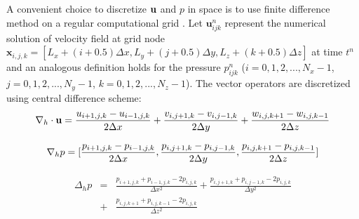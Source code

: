 A convenient choice to discretize $\mathbf{u}$ and $p$ in space is to use finite difference method on a regular computational grid \cite{blazek2015computational}. Let $\mathbf{u}^n_{ijk}$ represent the
numerical solution of velocity field at grid node  $\mathbf{x}_{i,j,k} =
[L_x+(i+0.5)\Delta x,L_y+(j+0.5)\Delta y, L_z+(k+0.5)\Delta z]$ at time $t^n$ 
and an analogous definition holds for the pressure $p^n_{ijk}$ ($i =
0,1,2,...,N_x-1$, $j = 0,1,2,...,N_y-1$, $k = 0,1,2,...,N_z-1$). The vector operators are discretized using central difference scheme:
\begin{equation} 
\nabla_h\cdot \mathbf{u} =
\frac{u_{i+1,j,k}-u_{i-1,j,k}}{2\Delta x} +
\frac{v_{i,j+1,k}-v_{i,j-1,k}}{2\Delta y} +
\frac{w_{i,j,k+1}-w_{i,j,k-1}}{2\Delta z}
\end{equation}

\begin{equation}
\nabla_h p =
[\frac{p_{i+1,j,k}-p_{i-1,j,k}}{2\Delta x},
\frac{p_{i,j+1,k}-p_{i,j-1,k}}{2\Delta y},
\frac{p_{i,j,k+1}-p_{i,j,k-1}}{2\Delta z}]\\    
\end{equation}

\begin{eqnarray}[lll]
\Delta_h p & = & \frac{p_{i+1,j,k}+p_{i-1,j,k}-2p_{i,j,k}}{\Delta x^2} +
\frac{p_{i,j+1,k}+p_{i,j-1,k}-2p_{i,j,k}}{\Delta y^2} \\
 \quad & + & \frac{p_{i,j,k+1}+p_{i,j,k-1}-2p_{i,j,k}}{\Delta z^2} 
\end{eqnarray}

